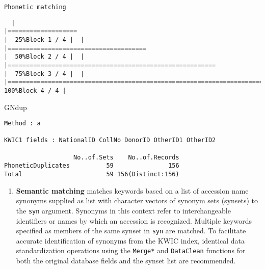 \documentclass[
]{article}
\newenvironment{Shaded}{\begin{snugshade}}{\end{snugshade}}
\newcommand{\NormalTok}[1]{#1}
\providecommand{\tightlist}{%
  \setlength{\itemsep}{0pt}\setlength{\parskip}{0pt}}
\begin{document}
\begin{verbatim}
Phonetic matching
\end{verbatim}

\begin{verbatim}
  |                                                                                    |===================                                                         |  25%Block 1 / 4 |  |                                                                                    |======================================                                      |  50%Block 2 / 4 |  |                                                                                    |=========================================================                   |  75%Block 3 / 4 |  |                                                                                    |============================================================================| 100%Block 4 / 4 |
\end{verbatim}

\begin{Shaded}
\begin{Highlighting}[]
\NormalTok{GNdup}
\end{Highlighting}
\end{Shaded}

\begin{verbatim}
Method : a

KWIC1 fields : NationalID CollNo DonorID OtherID1 OtherID2
 
                   No..of.Sets    No..of.Records
PhoneticDuplicates          59               156
Total                       59 156(Distinct:156)
\end{verbatim}

\begin{enumerate}
\def\labelenumi{\arabic{enumi}.}
\setcounter{enumi}{2}
\tightlist
\item
  \textbf{Semantic matching} matches keywords based on a list of
  accession name synonyms supplied as list with character vectors of
  synonym sets (synsets) to the \texttt{syn} argument. Synonyms in this
  context refer to interchangeable identifiers or names by which an
  accession is recognized. Multiple keywords specified as members of the
  same synset in \texttt{syn} are matched. To facilitate accurate
  identification of synonyms from the KWIC index, identical data
  standardization operations using the \texttt{Merge*} and
  \texttt{DataClean} functions for both the original database fields and
  the synset list are recommended.
\end{enumerate}
\end{document}
